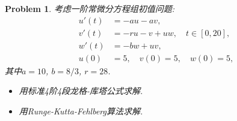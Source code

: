 \documentclass[a4paper, 12pt]{ctexart}
\theoremstyle{plain}
\newtheorem{problem}{Problem}[section]
\theoremstyle{plain}
\theoremstyle{plain}
\theoremstyle{nonumberplain}
\begin{document}
    \begin{problem}
        \label{problem: 3}
        考虑一阶常微分方程组初值问题:
        \begin{equation}
            \label{equation: problem3}
            \begin{aligned}
                u'(t) &= -au - av,\\
                v'(t) &= -ru - v + uw,\quad t\in [0, 20],\\
                w'(t) &= -bw + uv,\\
                u(0) &= 5,\quad v(0) = 5,\quad w(0) = 5,
            \end{aligned}
        \end{equation}
        其中$a=10$, $b=8/3$, $r=28$.
        \begin{itemize}
            \item 用标准4阶4段龙格-库塔公式求解.
            \item 用Runge-Kutta-Fehlberg算法求解.
        \end{itemize}
    \end{problem}
\end{document}
